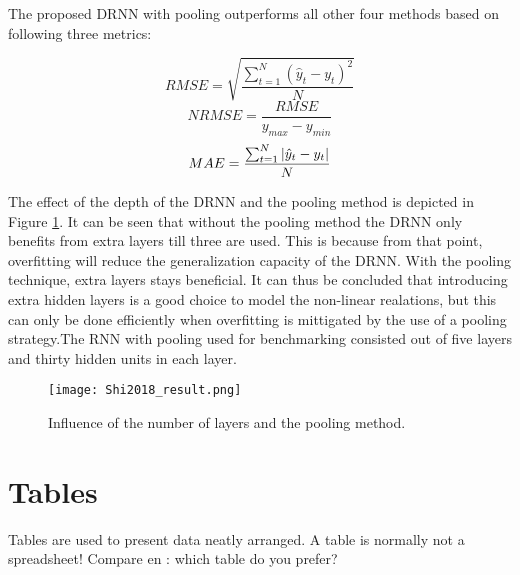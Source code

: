 The proposed DRNN with pooling outperforms all other four methods based on following three metrics:

\begin{equation}
	RMSE = \sqrt{\frac{\sum_{t=1}^{N}(\hat{y}_t-y_t)^2}{N}}
\end{equation}
\begin{equation}
	NRMSE = \frac{RMSE}{y_{max}-y_{min}}
\end{equation}
\begin{equation}
	MAE = \frac{\sum_{t=1}^{N}\abs{\hat{y}_t-y_t}}{N}
\end{equation}

The effect of the depth of the DRNN and the pooling method is depicted in Figure \ref{fig:Shi2018_result}. It can be seen that without the pooling method the DRNN only benefits from extra layers till three are used. This is because from that point, overfitting will reduce the generalization capacity of the DRNN. With the pooling technique, extra layers stays beneficial. It can thus be concluded that introducing extra hidden layers is a good choice to model the non-linear realations, but this can only be done efficiently when overfitting is mittigated by the use of a pooling strategy.The RNN with pooling used for benchmarking consisted out of five layers and thirty hidden units in each layer.

\begin{figure}[h!]
	\centering
	\texttt{[image: Shi2018\_result.png]}
	\caption{Influence of the number of layers and the pooling method.}
	\label{fig:Shi2018_result}
\end{figure}














\section{Tables}
Tables are used to present data neatly arranged. A table is normally
not a spreadsheet! Compare  en : which table do
you prefer?


